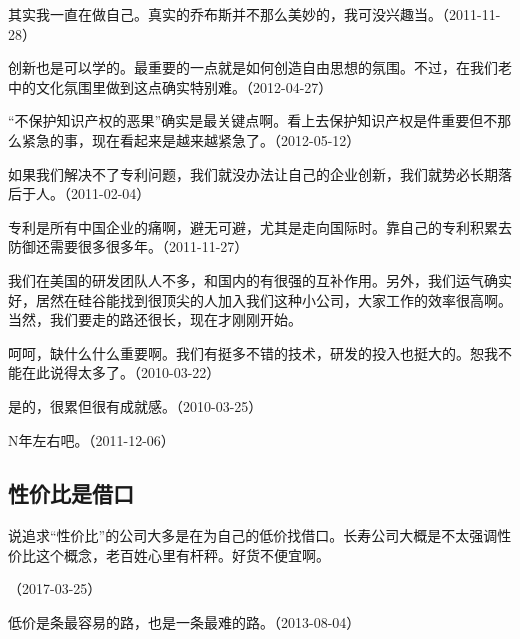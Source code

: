 其实我一直在做自己。真实的乔布斯并不那么美妙的，我可没兴趣当。（2011-11-28）

创新也是可以学的。最重要的一点就是如何创造自由思想的氛围。不过，在我们老中的文化氛围里做到这点确实特别难。（2012-04-27）


“不保护知识产权的恶果”确实是最关键点啊。看上去保护知识产权是件重要但不那么紧急的事，现在看起来是越来越紧急了。（2012-05-12）

如果我们解决不了专利问题，我们就没办法让自己的企业创新，我们就势必长期落后于人。（2011-02-04）

专利是所有中国企业的痛啊，避无可避，尤其是走向国际时。靠自己的专利积累去防御还需要很多很多年。（2011-11-27）


我们在美国的研发团队人不多，和国内的有很强的互补作用。另外，我们运气确实好，居然在硅谷能找到很顶尖的人加入我们这种小公司，大家工作的效率很高啊。当然，我们要走的路还很长，现在才刚刚开始。


呵呵，缺什么什么重要啊。我们有挺多不错的技术，研发的投入也挺大的。恕我不能在此说得太多了。（2010-03-22）


是的，很累但很有成就感。（2010-03-25）


N年左右吧。（2011-12-06）

\subsection{性价比是借口}

说追求“性价比”的公司大多是在为自己的低价找借口。长寿公司大概是不太强调性价比这个概念，老百姓心里有杆秤。好货不便宜啊。

（2017-03-25）


低价是条最容易的路，也是一条最难的路。（2013-08-04）


